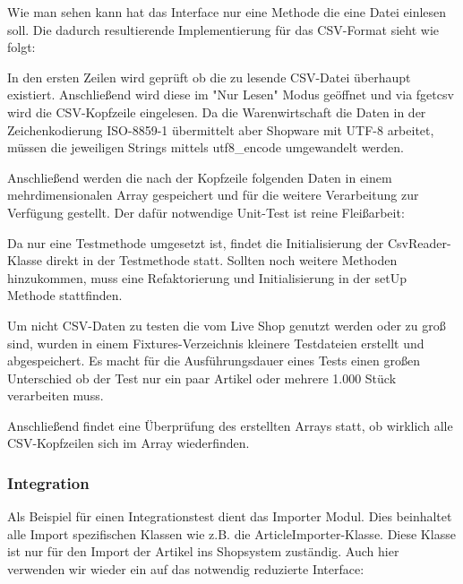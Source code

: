 

Wie man sehen kann hat das Interface nur eine Methode die eine Datei einlesen soll. Die dadurch resultierende Implementierung für das CSV-Format sieht wie folgt:



In den ersten Zeilen wird geprüft ob die zu lesende CSV-Datei überhaupt existiert. Anschließend wird diese im "Nur Lesen" Modus geöffnet und via fgetcsv wird die CSV-Kopfzeile eingelesen. Da die Warenwirtschaft die Daten in der Zeichenkodierung ISO-8859-1 übermittelt aber Shopware mit UTF-8 arbeitet, müssen die jeweiligen Strings mittels utf8\_encode umgewandelt werden.

Anschließend werden die nach der Kopfzeile folgenden Daten in einem mehrdimensionalen Array gespeichert und für die weitere Verarbeitung zur Verfügung gestellt. Der dafür notwendige Unit-Test ist reine Fleißarbeit: 



Da nur eine Testmethode umgesetzt ist, findet die Initialisierung der CsvReader-Klasse direkt in der Testmethode statt. Sollten noch weitere Methoden hinzukommen, muss eine Refaktorierung und Initialisierung in der setUp Methode stattfinden.

Um nicht CSV-Daten zu testen die vom Live Shop genutzt werden oder zu groß sind, wurden in einem Fixtures-Verzeichnis kleinere Testdateien erstellt und abgespeichert. Es macht für die Ausführungsdauer eines Tests einen großen Unterschied ob der Test nur ein paar Artikel oder mehrere 1.000 Stück verarbeiten muss. 

Anschließend findet eine Überprüfung des erstellten Arrays statt, ob wirklich alle CSV-Kopfzeilen sich im Array wiederfinden.

\subsubsection{Integration}

Als Beispiel für einen Integrationstest dient das Importer Modul. Dies beinhaltet alle Import spezifischen Klassen wie z.B. die ArticleImporter-Klasse. Diese Klasse ist nur für den Import der Artikel ins Shopsystem zuständig. Auch hier verwenden wir wieder ein auf das notwendig reduzierte Interface:




